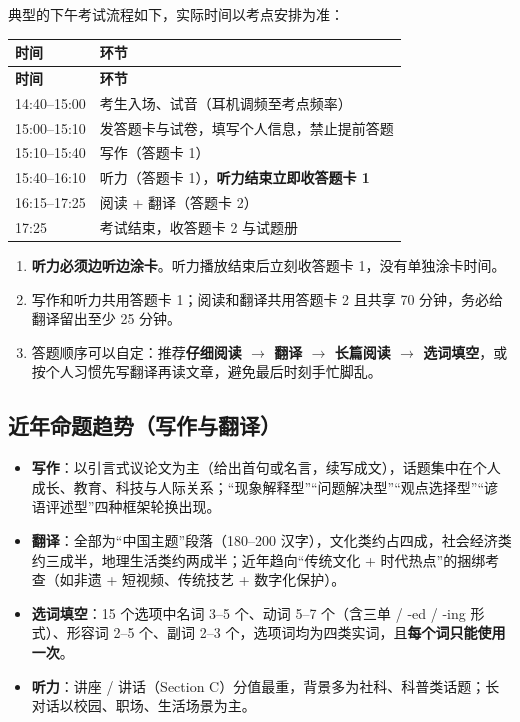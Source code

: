典型的下午考试流程如下，实际时间以考点安排为准：

\begin{center}
\small
\begin{longtable}{p{3.2cm}p{10.2cm}}
\toprule
\textbf{时间} & \textbf{环节} \\
\midrule
\endfirsthead
\toprule
\textbf{时间} & \textbf{环节} \\
\midrule
\endhead
14:40--15:00 & 考生入场、试音（耳机调频至考点频率） \\
15:00--15:10 & 发答题卡与试卷，填写个人信息，禁止提前答题 \\
15:10--15:40 & 写作（答题卡 1） \\
15:40--16:10 & 听力（答题卡 1），\textbf{听力结束立即收答题卡 1} \\
16:15--17:25 & 阅读 + 翻译（答题卡 2） \\
17:25 & 考试结束，收答题卡 2 与试题册 \\
\bottomrule
\end{longtable}
\end{center}

\begin{notebox}[三条“保命”规则]
\begin{enumerate}
  \item \textbf{听力必须边听边涂卡}。听力播放结束后立刻收答题卡 1，没有单独涂卡时间。
  \item 写作和听力共用答题卡 1；阅读和翻译共用答题卡 2 且共享 70 分钟，务必给翻译留出至少 25 分钟。
  \item 答题顺序可以自定：推荐\textbf{仔细阅读 $\to$ 翻译 $\to$ 长篇阅读 $\to$ 选词填空}，或按个人习惯先写翻译再读文章，避免最后时刻手忙脚乱。
\end{enumerate}
\end{notebox}

\subsection{近年命题趋势（写作与翻译）}

\begin{itemize}
  \item \textbf{写作}：以引言式议论文为主（给出首句或名言，续写成文），话题集中在个人成长、教育、科技与人际关系；“现象解释型”“问题解决型”“观点选择型”“谚语评述型”四种框架轮换出现。
  \item \textbf{翻译}：全部为“中国主题”段落（180--200 汉字），文化类约占四成，社会经济类约三成半，地理生活类约两成半；近年趋向“传统文化 + 时代热点”的捆绑考查（如非遗 + 短视频、传统技艺 + 数字化保护）。
  \item \textbf{选词填空}：15 个选项中名词 3--5 个、动词 5--7 个（含三单 / -ed / -ing 形式）、形容词 2--5 个、副词 2--3 个，选项词均为四类实词，且\textbf{每个词只能使用一次}。
  \item \textbf{听力}：讲座 / 讲话（Section C）分值最重，背景多为社科、科普类话题；长对话以校园、职场、生活场景为主。
\end{itemize}
